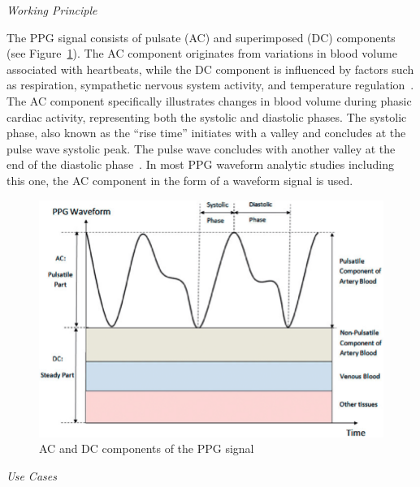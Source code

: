 \vspace{0.2cm}
\textit{Working Principle}
\vspace{0.2cm}

The PPG signal consists of pulsate (AC) and superimposed (DC) components (see Figure~\ref{fig:acdc}).
The AC component originates from variations in blood volume associated with heartbeats,
while the DC component is influenced by factors such as respiration, sympathetic nervous system activity, and temperature regulation~\cite{allenPhotoplethysmographyItsApplication2007a}.
The AC component specifically illustrates changes in blood volume during phasic cardiac activity, representing both the systolic and diastolic phases.
The systolic phase, also known as the \enquote{rise time} initiates with a valley and concludes at the pulse wave systolic peak.
The pulse wave concludes with another valley at the end of the diastolic phase~\cite{weisslerSystolicTimeIntervals1968}.
In most PPG waveform analytic studies including this one, the AC component in the form of a waveform signal is used.

\begin{figure}[h]
    \centering
    \includegraphics[scale=0.5]{images/ppg/ac+dc}
    \caption{AC and DC components of the PPG signal \cite{mohanSpotMeasurementHeart2016}}
    \label{fig:acdc}
\end{figure}

\vspace{0.2cm}
\textit{Use Cases}
\vspace{0.2cm}

